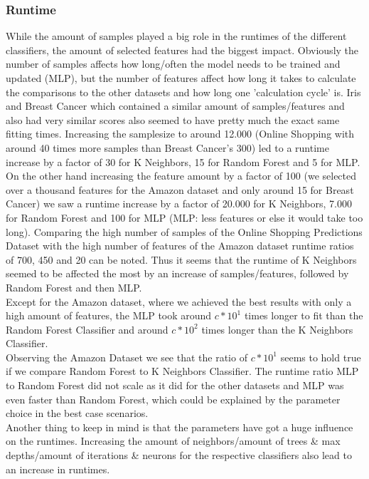 \documentclass{article}
\begin{document}
\subsubsection{Runtime}
While the amount of samples played a big role in the runtimes of the different classifiers, the amount of selected features had the biggest impact. Obviously the number of samples affects how long/often the model needs to be trained and updated (MLP), but the number of features affect how long it takes to calculate the comparisons to the other datasets and how long one 'calculation cycle' is. Iris and Breast Cancer which contained a similar amount of samples/features and also had very similar scores also seemed to  have pretty much the exact same fitting times. Increasing the samplesize to around 12.000 (Online Shopping with around 40 times more samples than Breast Cancer's 300) led to a runtime increase by a factor of 30 for K Neighbors, 15 for Random Forest and 5 for MLP.\\ On the other hand increasing the feature amount by a factor of 100 (we selected over a thousand features for the Amazon dataset and only around 15 for Breast Cancer) we saw a runtime increase by a factor of 20.000 for K Neighbors, 7.000 for Random Forest and 100 for MLP (MLP: less features or else it would take too long). 
Comparing the high number of samples of the Online Shopping Predictions Dataset with the high number of features of the Amazon dataset runtime ratios of 700, 450 and 20 can be noted. Thus it seems that the runtime of K Neighbors seemed to be affected the most by an increase of samples/features, followed by Random Forest and then MLP. \\
\newline
Except for the Amazon dataset, where we achieved the best results with only a high amount of features, the MLP took around $c*10^1$ times longer to fit than the Random Forest Classifier and around $c* 10^2$ times longer than the K Neighbors Classifier.\\
Observing the Amazon Dataset we see that the ratio of $c*10^1$ seems to hold true if we compare Random Forest to K Neighbors Classifier. The runtime ratio MLP to Random Forest did not scale as it did for the other datasets and MLP was even faster than Random Forest, which could be explained by the parameter choice in the best case scenarios. \\
Another thing to keep in mind is that the parameters have got a huge influence on the runtimes. Increasing the amount of neighbors/amount of trees \& max depths/amount of iterations \& neurons for the respective classifiers also lead to an increase in runtimes.
\end{document}
